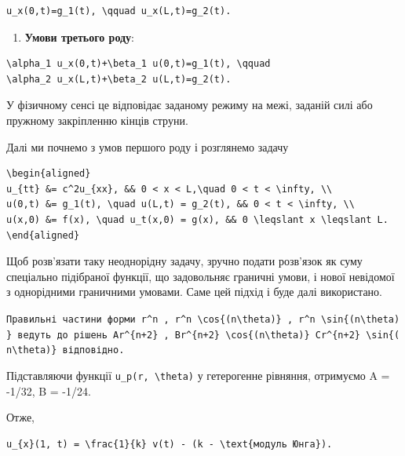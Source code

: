 \documentclass[
  ukrainian,
]{article}
\providecommand{\tightlist}{%
  \setlength{\itemsep}{0pt}\setlength{\parskip}{0pt}}
\begin{document}
\begin{verbatim}
u_x(0,t)=g_1(t), \qquad u_x(L,t)=g_2(t).
\end{verbatim}

\begin{enumerate}
\def\labelenumi{\arabic{enumi}.}
\setcounter{enumi}{2}
\tightlist
\item
  \textbf{Умови третього роду}:
\end{enumerate}

\begin{verbatim}
\alpha_1 u_x(0,t)+\beta_1 u(0,t)=g_1(t), \qquad
\alpha_2 u_x(L,t)+\beta_2 u(L,t)=g_2(t).
\end{verbatim}

У фізичному сенсі це відповідає заданому режиму на межі, заданій силі
або пружному закріпленню кінців струни.

Далі ми почнемо з умов першого роду і розглянемо задачу

\begin{verbatim}
\begin{aligned}
u_{tt} &= c^2u_{xx}, && 0 < x < L,\quad 0 < t < \infty, \\
u(0,t) &= g_1(t), \quad u(L,t) = g_2(t), && 0 < t < \infty, \\
u(x,0) &= f(x), \quad u_t(x,0) = g(x), && 0 \leqslant x \leqslant L.
\end{aligned}
\end{verbatim}

Щоб розв'язати таку неоднорідну задачу, зручно подати розв'язок як суму
спеціально підібраної функції, що задовольняє граничні умови, і нової
невідомої з однорідними граничними умовами. Саме цей підхід і буде далі
використано.

\texttt{Правильні\ частини\ форми\ \textquotesingle{}r\^{}n\textquotesingle{}\ ,\ \textquotesingle{}r\^{}n\ \textbackslash{}cos\{(n\textbackslash{}theta)\}\textquotesingle{}\ ,\ \textquotesingle{}r\^{}n\ \textbackslash{}sin\{(n\textbackslash{}theta)\}\textquotesingle{}\ ведуть\ до\ рішень\ \textquotesingle{}Ar\^{}\{n+2\}\textquotesingle{}\ ,\ \textquotesingle{}Br\^{}\{n+2\}\ \textbackslash{}cos\{(n\textbackslash{}theta)\}\textquotesingle{}\ \textquotesingle{}Cr\^{}\{n+2\}\ \textbackslash{}sin\{(n\textbackslash{}theta)\}\textquotesingle{}\ відповідно.}

Підставляючи функції \texttt{u\_p(r,\ \textbackslash{}theta)} у
гетерогенне рівняння, отримуємо A = -1/32, B = -1/24.

Отже,

\begin{verbatim}
u_{x}(1, t) = \frac{1}{k} v(t) - (k - \text{модуль Юнга}).
\end{verbatim}
\end{document}
